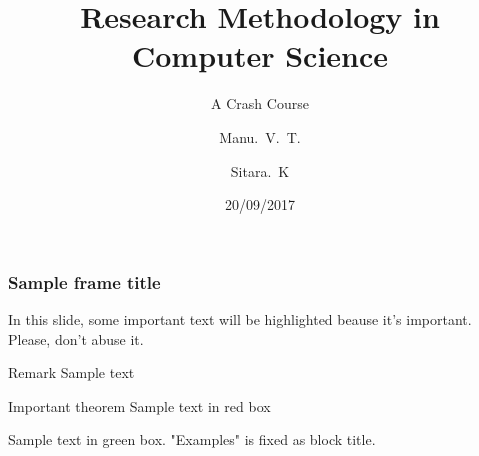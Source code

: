 \documentclass{beamer}
\title{Research Methodology in Computer Science}
\subtitle{A Crash Course}
\author{Manu.~V.~T.\inst{1} \and Sitara.~K\inst{2}}
\institute
{
	\inst{1}%
	IDRBT\\
	Hyderabad
	\and
	\inst{2}%
	SCIS\\
	University of Hyderabad
}
\date{20/09/2017}
\begin{document}
\frame{\titlepage}
\begin{frame}
\frametitle{Sample frame title}
 
In this slide, some important text will be
\alert{highlighted} beause it's important.
Please, don't abuse it.
 
\begin{block}{Remark}
Sample text
\end{block}
 
\begin{alertblock}{Important theorem}
Sample text in red box
\end{alertblock}
 
\begin{examples}
Sample text in green box. "Examples" is fixed as block title.
\end{examples}
\end{frame}
\end{document}
